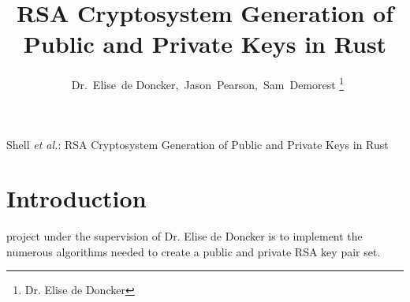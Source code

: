 \documentclass[12pt,journal,compsoc]{IEEEtran}
\begin{document}
%
\title{RSA Cryptosystem Generation of Public and Private Keys in Rust}
\author{~Dr.~Elise~de Doncker,~Jason~Pearson,~Sam~Demorest%
\thanks{Dr. Elise de Doncker}}

\markboth{}%
{Shell \MakeLowercase{\textit{et al.}}: RSA Cryptosystem Generation of Public and Private Keys in Rust}





\maketitle

\IEEEdisplaynotcompsoctitleabstractindextext
\IEEEpeerreviewmaketitle



\section{Introduction}
 project under the supervision of Dr. Elise de Doncker is to implement the numerous algorithms needed to create a public and private RSA key pair set. 
\end{document}

